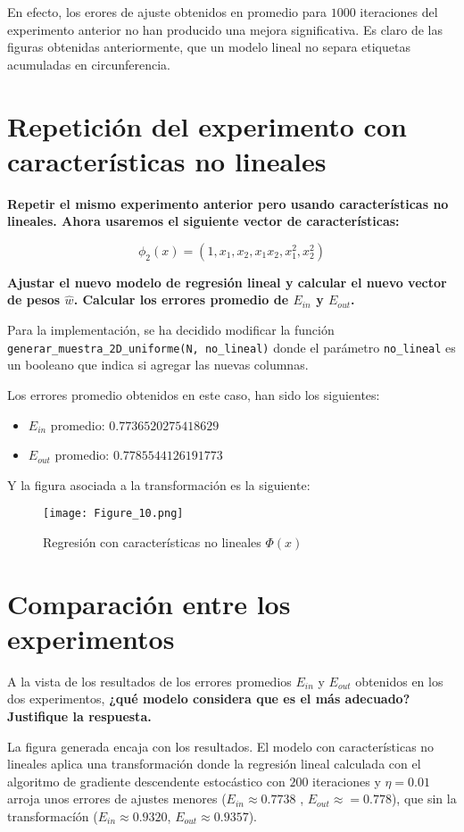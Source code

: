 En efecto, los erores de ajuste obtenidos en promedio para $1000$ iteraciones del
experimento anterior no han producido una mejora significativa. Es claro de las figuras
obtenidas anteriormente, que un modelo lineal no separa etiquetas acumuladas en
circunferencia.

\section{Repetición del experimento con características no lineales}

\textbf{Repetir el mismo experimento anterior pero usando características no
lineales. Ahora usaremos el siguiente vector de características:}

$$
\phi_2(x) = (1, x_1, x_2, x_1 x_2, x_1^2, x_2^2)
$$

\textbf{Ajustar el nuevo modelo de regresión lineal y calcular el nuevo vector de pesos $\hat{w}$.
Calcular los errores promedio de $E_{in}$ y $E_{out}$.}

\hfill \break

Para la implementación, se ha decidido modificar la función \\
\texttt{generar_muestra_2D_uniforme(N, no_lineal)}
donde el parámetro \texttt{no_lineal} es un booleano
que indica si agregar las nuevas columnas.

Los errores promedio obtenidos en este caso, han sido los siguientes:

\begin{itemize}
\item $E_{in}$ promedio: $0.7736520275418629$
\item $E_{out}$ promedio: $0.7785544126191773$
\end{itemize}

Y la figura asociada a la transformación es la siguiente:

\begin{figure}[H]
\centering
\texttt{[image: Figure\_10.png]}
\caption{Regresión con características no lineales $\Phi(x)$}
\end{figure}

\section{Comparación entre los experimentos}

A la vista de los resultados de los errores promedios $E_{in}$ y $E_{out}$
obtenidos en los dos experimentos, \textbf{¿qué modelo considera que es el más
adecuado? Justifique la respuesta.}

\hfill \break

La figura generada encaja con los resultados. El modelo con características no
lineales aplica una transformación donde la regresión lineal calculada con el
algoritmo de gradiente descendente estocástico con $200$ iteraciones y $\eta=0.01$
arroja unos errores de ajustes menores ($E_{in} \approx 0.7738$ , $E_{out} \approx = 0.778$),
que sin la transformacíón ($E_{in} \approx 0.9320$, $E_{out} \approx 0.9357$).